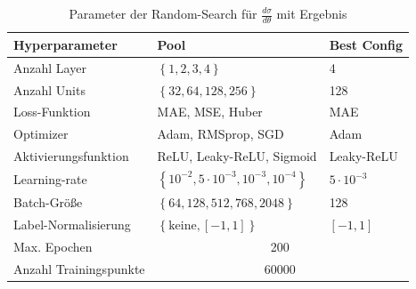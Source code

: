 \begin{table}
	\centering
	\begin{tabular}{lll}

		Hyperparameter & Pool & Best Config \\
		\hline\hline
		Anzahl Layer & $\left\lbrace 1, 2, 3, 4 \right\rbrace$ & 4 \\
		Anzahl Units & $\left\lbrace 32, 64, 128, 256\right\rbrace$ & 128 \\
		Loss-Funktion & MAE, MSE, Huber & MAE \\
		Optimizer & Adam, RMSprop, SGD  & Adam\\
		Aktivierungsfunktion & ReLU, Leaky-ReLU, Sigmoid & Leaky-ReLU \\
		Learning-rate & $\left\lbrace 10^{-2}, 5 \cdot 10^{-3}, 10^{-3}, 10^{-4} \right\rbrace $ & $5 \cdot 10^{-3}$\\
		Batch-Größe & $\left\lbrace 64, 128, 512, 768, 2048 \right\rbrace $ & 128\\
		Label-Normalisierung & $\left\lbrace \text{keine}, [-1,1]\right\rbrace $ & $[-1,1]$\\
		\hline
		Max. Epochen & \multicolumn{2}{c}{200}\\
		Anzahl Trainingspunkte & \multicolumn{2}{c}{60000} \\

	\end{tabular}
	\caption{Parameter der Random-Search für $\frac{d\sigma}{d\theta}$ mit Ergebnis}
	\label{hyperparameter-theta}
\end{table}

